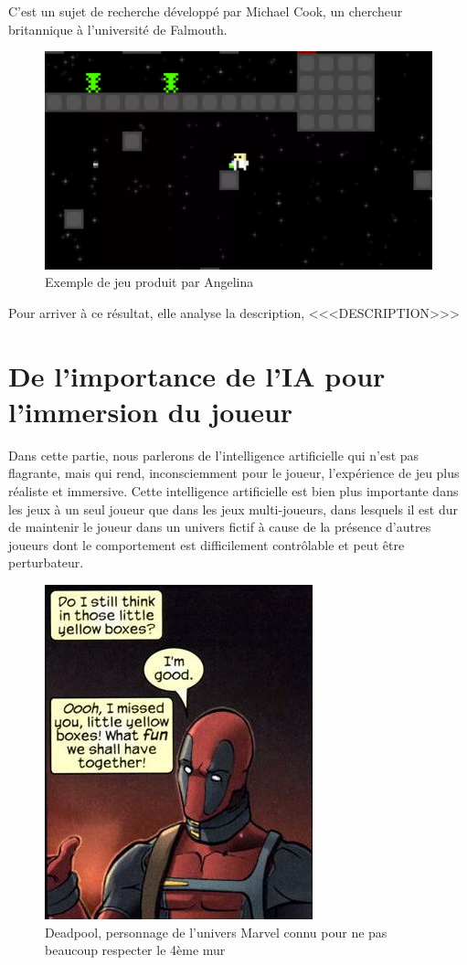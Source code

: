 \documentclass[a4paper, 12pt]{article} %
\begin{document}
C’est un sujet de recherche développé par Michael Cook, un chercheur britannique à l’université de Falmouth.

\begin{figure}[!h]%
	\begin{center} 
		\includegraphics[width=0.60\columnwidth]{images/angelina.png}%
		\caption{Exemple de jeu produit par Angelina}%
	\end{center}
\end{figure}

Pour arriver à ce résultat, elle analyse la description, <<<DESCRIPTION>>>


\newpage
\section{De l’importance de l’IA pour l’immersion du joueur}

Dans cette partie, nous parlerons de l’intelligence artificielle qui n’est pas flagrante, mais qui rend, inconsciemment pour le joueur, l'expérience de jeu plus réaliste et immersive. Cette intelligence artificielle est bien plus importante dans les jeux à un seul joueur que dans les jeux multi-joueurs, dans lesquels il est dur de maintenir le joueur dans un univers fictif à cause de la présence d’autres joueurs dont le comportement est difficilement contrôlable et peut être perturbateur.

\begin{figure}[!h]%
	\begin{center} 
		\includegraphics[width=0.60\columnwidth]{images/deadpool.png}%
		\caption{Deadpool, personnage de l’univers Marvel connu pour ne pas beaucoup respecter le 4ème mur}%
	\end{center}
\end{figure}
\end{document}
